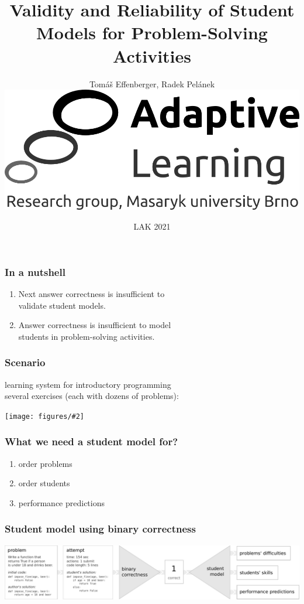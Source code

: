 \documentclass[bigger]{beamer}
\title{Validity and Reliability of Student Models for Problem-Solving Activities}
\author{Tom\'a\v{s} Effenberger, Radek Pel\'anek\\[5mm]
\includegraphics[width=.35\linewidth]{figures/al-logo}\\[3mm]
}
\date{LAK 2021}
\newcommand{\img}[2]{
  \begin{center}
    \texttt{[image: figures/\#2]}
  \end{center}
}
\begin{document}
\frame{\titlepage}


\begin{frame}
\frametitle{In a nutshell}
\begin{enumerate}
\item Next answer correctness is insufficient to\\validate student models.
\bigskip
\item Answer correctness is insufficient to model\\students in problem-solving activities.
\end{enumerate}
\end{frame}



\begin{frame}
  \frametitle{Scenario}
  learning system for introductory programming\\
  several exercises (each with dozens of problems):
  \img{1.0}{exercises}
\end{frame}


\begin{frame}
  \frametitle{What we need a student model for?}
  \begin{enumerate}
    \item order problems
    \item order students
    \item performance predictions
  \end{enumerate}
\end{frame}

\begin{frame}
  \frametitle{Student model using binary correctness}
  \vspace{-1cm}  %
  \hspace*{-0.9cm}
  \includegraphics[width=1.15\linewidth]{figures/pipeline-binary}
\end{frame}
\end{document}
